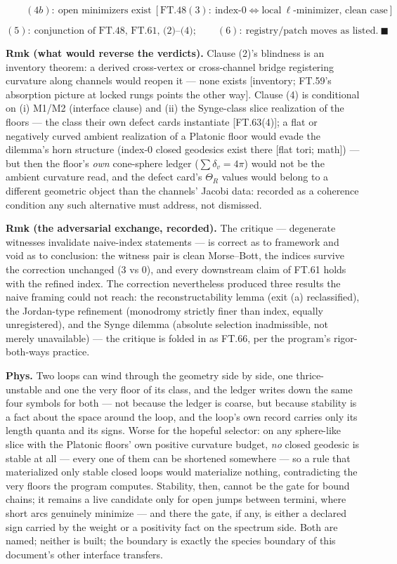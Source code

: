 \begin{theorem}
\[
\qquad (4b):\ \text{open minimizers exist}\ [\mathrm{FT.48}(3):\ \text{index-0}\iff\text{local}\ \ell\text{-minimizer, clean case}]
\]

\[
(5):\ \text{conjunction of FT.48, FT.61, (2)--(4)};\qquad(6):\ \text{registry/patch moves as listed}.\ \blacksquare
\]

\textbf{Rmk (what would reverse the verdicts).} Clause (2)'s blindness is an inventory theorem: a derived cross-vertex or cross-channel bridge registering curvature along channels would reopen it — none exists [inventory; FT.59's absorption picture at locked rungs points the other way]. Clause (4) is conditional on (i) M1/M2 (interface clause) and (ii) the Synge-class slice realization of the floors — the class their own defect cards instantiate [FT.63(4)]; a flat or negatively curved ambient realization of a Platonic floor would evade the dilemma's horn structure (index-0 closed geodesics exist there [flat tori; math]) — but then the floor's \textit{own} cone-sphere ledger ($\sum\delta_v=4\pi$) would not be the ambient curvature read, and the defect card's $\Theta_R$ values would belong to a different geometric object than the channels' Jacobi data: recorded as a coherence condition any such alternative must address, not dismissed.

\textbf{Rmk (the adversarial exchange, recorded).} The critique — degenerate witnesses invalidate naive-index statements — is correct as to framework and void as to conclusion: the witness pair is clean Morse–Bott, the indices survive the correction unchanged ($3$ vs $0$), and every downstream claim of FT.61 holds with the refined index. The correction nevertheless produced three results the naive framing could not reach: the reconstructability lemma (exit (a) reclassified), the Jordan-type refinement (monodromy strictly finer than index, equally unregistered), and the Synge dilemma (absolute selection inadmissible, not merely unavailable) — the critique is folded in as FT.66, per the program's rigor-both-ways practice.

\textbf{Phys.} Two loops can wind through the geometry side by side, one thrice-unstable and one the very floor of its class, and the ledger writes down the same four symbols for both — not because the ledger is coarse, but because stability is a fact about the space around the loop, and the loop's own record carries only its length quanta and its signs. Worse for the hopeful selector: on any sphere-like slice with the Platonic floors' own positive curvature budget, \textit{no} closed geodesic is stable at all — every one of them can be shortened somewhere — so a rule that materialized only stable closed loops would materialize nothing, contradicting the very floors the program computes. Stability, then, cannot be the gate for bound chains; it remains a live candidate only for open jumps between termini, where short arcs genuinely minimize — and there the gate, if any, is either a declared sign carried by the weight or a positivity fact on the spectrum side. Both are named; neither is built; the boundary is exactly the species boundary of this document's other interface transfers.


\end{theorem}
